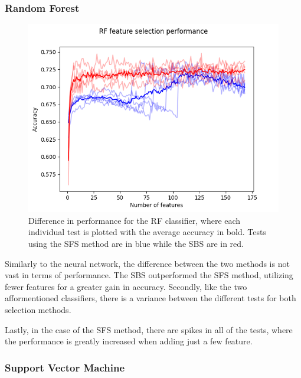 \documentclass{kththesis}
\begin{document}
\newpage

\subsubsection{Random Forest}

\begin{figure}[h!]
  \begin{center}
    \includegraphics[scale=0.8]{../new_plots/rf_graph.png}
    \caption{Difference in performance for the RF classifier, where each individual test is plotted with the average accuracy in bold. Tests using the SFS method are in blue while the SBS are in red.}
  \end{center}
\end{figure}

Similarly to the neural network, the difference between the two methods is not vast in terms of performance. The SBS outperformed the SFS method, utilizing fewer features for a greater gain in accuracy. Secondly, like the two afformentioned classifiers, there is a variance between the different tests for both selection methods.

Lastly, in the case of the SFS method, there are spikes in all of the tests, where the performance is greatly increased when adding just a few feature. 

\newpage

\subsubsection{Support Vector Machine}
\end{document}
